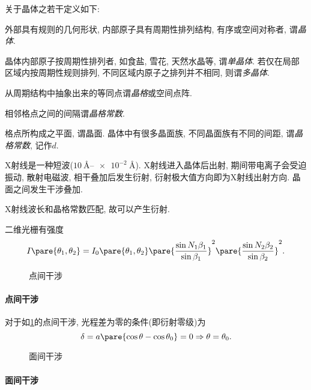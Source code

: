 \documentclass{ctexart}
\begin{document}
关于晶体之若干定义如下:
\begin{cenum}
    \item 外部具有规则的几何形状, 内部原子具有周期性排列结构, 有序或空间对称者, 谓\emph{晶体}.
    \item 晶体内部原子按周期性排列者, 如食盐, 雪花, 天然水晶等, 谓\emph{单晶体}. 若仅在局部区域内按周期性规则排列, 不同区域内原子之排列并不相同, 则谓\emph{多晶体}.
    \item 从周期结构中抽象出来的等同点谓\emph{晶格}或空间点阵.
    \item 相邻格点之间的间隔谓\emph{晶格常数}.
    \item 格点所构成之平面, 谓晶面. 晶体中有很多晶面族, 不同晶面族有不同的间距, 谓\emph{晶格常数}, 记作$d$.
\end{cenum}
X射线是一种短波($\SI{10}{\angstrom}$--$\SI{e-2}{\angstrom}$). X射线进入晶体后出射, 期间带电离子会受迫振动, 散射电磁波, 相干叠加后发生衍射, 衍射极大值方向即为X射线出射方向. 晶面之间发生干涉叠加.
\begin{remark}
    X射线波长和晶格常数匹配, 故可以产生衍射.
\end{remark}
\par
二维光栅有强度
\[ I\pare{\theta_1,\theta_2} = I_0\pare{\theta_1,\theta_2} \pare{\frac{\sin N_1\beta_1}{\sin\beta_1}}^2 \pare{\frac{\sin N_2\beta_2}{\sin\beta_2}}^2. \]

\begin{figure}[ht]
    \centering
    \caption{点间干涉}
    \label{fig:点间干涉}
\end{figure}

\paragraph{点间干涉} %
\label{par:点间干涉}

对于如\cref{fig:点间干涉}的点间干涉, 光程差为零的条件(即衍射零级)为
\[ \delta = a\pare{\cos\theta - \cos\theta_0} = 0 \Rightarrow \theta = \theta_0. \]


\begin{figure}[ht]
    \centering
    \caption{面间干涉}
    \label{fig:面间干涉}
\end{figure}

\paragraph{面间干涉} %
\label{par:面间干涉}
\end{document}
